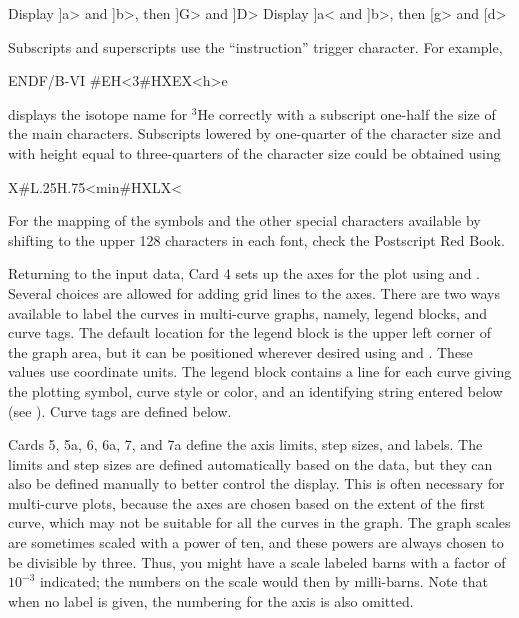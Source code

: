 \small
\begin{ccode}

   Display ]a> and ]b>, then ]G> and ]D>
   Display ]a< and ]b>, then [g> and [d>

\end{ccode}
\normalsize

\noindent
Subscripts and superscripts use the ``instruction'' trigger character.
For example,

\small
\begin{ccode}

   ENDF/B-VI #EH<3#HXEX<h>e

\end{ccode}
\normalsize

\noindent
displays the isotope name for $^3$He correctly with a subscript one-half
the size of the main characters.  Subscripts lowered by one-quarter of
the character size and with height equal to three-quarters of the
character size could be obtained using

\small
\begin{ccode}

  X#L.25H.75<min#HXLX<

\end{ccode}
\normalsize

\noindent
For the mapping of the symbols and the other special characters available
by shifting to the upper 128 characters in each font, check the Postscript
Red Book\cite{redbook}.

Returning to the input data, Card 4 sets up the axes for the plot
using  and .  Several choices are allowed
for adding grid lines to the axes.  There are two ways available
to label the curves in multi-curve graphs, namely, legend blocks, and
curve tags.  The default location for the legend block is the upper
left corner of the graph area, but it can be positioned wherever
desired using  and .  These values use
coordinate units.  The legend block contains a line for each curve
giving the plotting symbol, curve style or color, and an identifying
string entered below (see ).  Curve tags are defined
below.

Cards 5, 5a, 6, 6a, 7, and 7a define the axis limits, step sizes, and
labels.  The limits and step sizes are defined automatically based
on the data, but they can also be defined manually to better control
the display.  This is often necessary for multi-curve plots, because
the axes are chosen based on the extent of the first curve, which may
not be suitable for all the curves in the graph.  The graph scales
are sometimes scaled with a power of ten, and these powers are
always chosen to be divisible by three.  Thus, you might have a
scale labeled barns with a factor of $10^{-3}$ indicated; the numbers
on the scale would then by milli-barns.  Note that when no label is
given, the numbering for the axis is also omitted.

